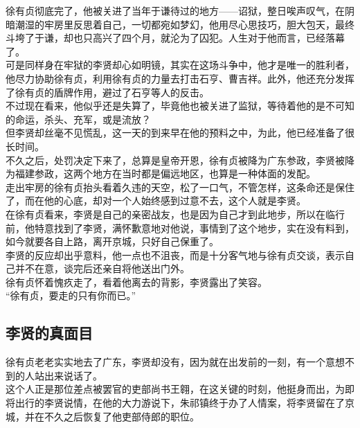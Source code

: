 \begin{multicols}{\theparacolNo}
徐有贞彻底完了，他被关进了当年于谦待过的地方——诏狱，整日唉声叹气，在阴暗潮湿的牢房里反思着自己，一切都宛如梦幻，他用尽心思技巧，胆大包天，最终斗垮了于谦，却也只高兴了四个月，就沦为了囚犯。人生对于他而言，已经落幕了。\\

可是同样身在牢狱的李贤却心如明镜，其实在这场斗争中，他才是唯一的胜利者，他尽力协助徐有贞，利用徐有贞的力量去打击石亨、曹吉祥。此外，他还充分发挥了徐有贞的盾牌作用，避过了石亨等人的反击。\\

不过现在看来，他似乎还是失算了，毕竟他也被关进了监狱，等待着他的是不可知的命运，杀头、充军，或是流放？\\

但李贤却丝毫不见慌乱，这一天的到来早在他的预料之中，为此，他已经准备了很长时间。\\

不久之后，处罚决定下来了，总算是皇帝开恩，徐有贞被降为广东参政，李贤被降为福建参政，这两个地方在当时都是偏远地区，也算是一种体面的发配。\\

走出牢房的徐有贞抬头看着久违的天空，松了一口气，不管怎样，这条命还是保住了，而在他的心底，却对一个人始终感到过意不去，这个人就是李贤。\\

在徐有贞看来，李贤是自己的亲密战友，也是因为自己才到此地步，所以在临行前，他特意找到了李贤，满怀歉意地对他说，事情到了这个地步，实在没有料到，如今就要各自上路，离开京城，只好自己保重了。\\

李贤的反应却出乎意料，他一点也不沮丧，而是十分客气地与徐有贞交谈，表示自己并不在意，谈完后还亲自将他送出门外。\\

徐有贞怀着愧疚走了，看着他离去的背影，李贤露出了笑容。\\

“徐有贞，要走的只有你而已。”\\

\subsection{李贤的真面目}
徐有贞老老实实地去了广东，李贤却没有，因为就在出发前的一刻，有一个意想不到的人站出来说话了。\\

这个人正是那位差点被罢官的吏部尚书王翱，在这关键的时刻，他挺身而出，为即将出行的李贤说情，在他的大力游说下，朱祁镇终于办了人情案，将李贤留在了京城，并在不久之后恢复了他吏部侍郎的职位。\\


\end{multicols}
